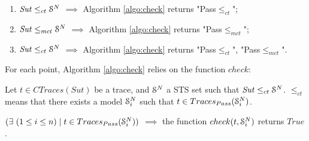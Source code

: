 \begin{enumerate}
    \item $\mathit{Sut} \leq_{ct} \EuScript{S}^N$ $\implies$
        Algorithm \ref{algo:check} returns "Pass$\leq_{ct}$";

    \item $\mathit{Sut} \leq_{mct} \EuScript{S}^N$ $\implies$
        Algorithm \ref{algo:check} returns "Pass$\leq_{mct}$";

    \item $\mathit{Sut} \leq_{ct} \EuScript{S}^N$ $\implies$
        Algorithm \ref{algo:check} returns "Pass$\leq_{ct}$",
        "Pass$\leq_{mct}$".
\end{enumerate}

For each point, Algorithm \ref{algo:check} relies on the
function $check$:

\begin{proposition}
    Let $t \in CTraces(Sut)$ be a trace, and $\EuScript{S}^{N}$ a
    STS set such that $\mathit{Sut} \leq_{ct} \EuScript{S}^{N}$.
    $\leq_{ct}$ means that there exists a model
    $\EuScript{S}_i^{N}$ such that $t \in
    Traces_{Pass}(\EuScript{S}_i^{N})$.

    $(\exists ~(1 \leq i \leq n) \mid t \in
    Traces_{Pass}(\EuScript{S}_i^{N}))$ $\implies$ the function
    $check(t, \EuScript{S}_i^{N})$ returns $True$.

    \label{prop:check}
\end{proposition}

